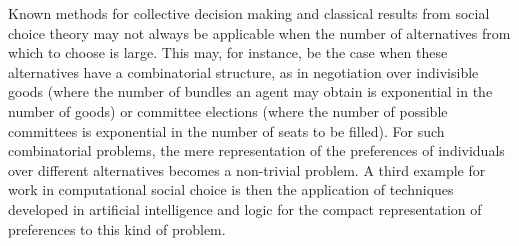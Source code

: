 \documentclass{comsoc2016}
\begin{document}
Known methods for collective decision making and classical results from 
social choice theory may not always be applicable when the number of 
alternatives from which to choose is large. This may, for instance, be 
the case when these alternatives have a combinatorial structure, as in 
negotiation over indivisible goods (where the number of bundles an agent 
may obtain is exponential in the number of goods) or committee elections 
(where the number of possible committees is exponential in the number 
of seats to be filled). For such combinatorial problems, the mere 
representation of the preferences of individuals over different 
alternatives becomes a non-trivial problem. A third example for work 
in computational social choice is then the application of techniques 
developed in artificial intelligence and logic for the compact 
representation of preferences to this kind of problem. 


\end{document}
